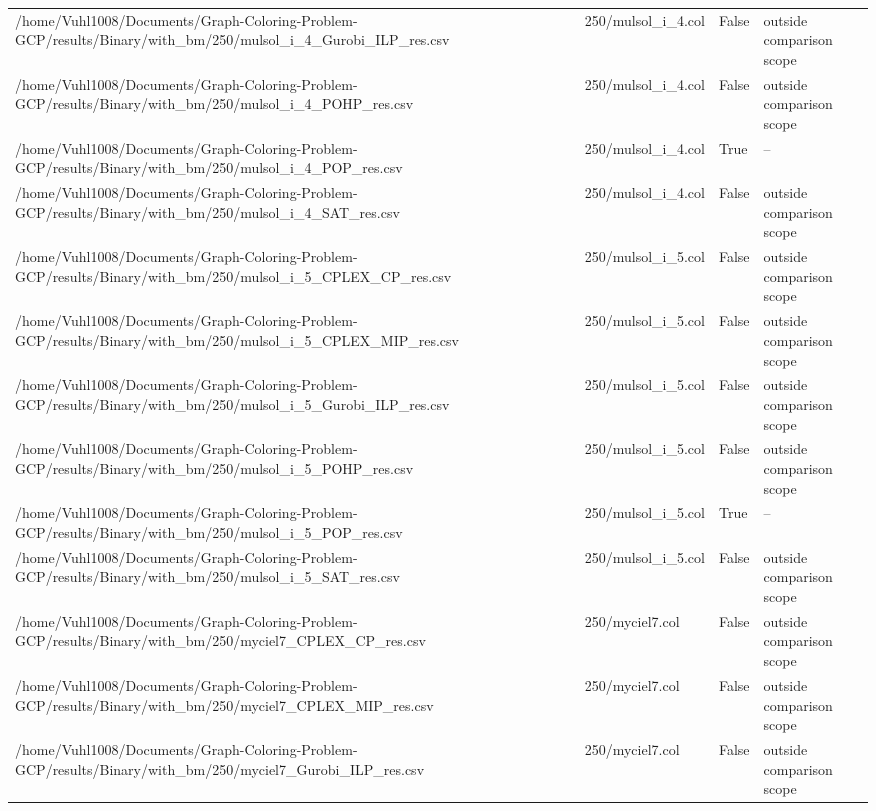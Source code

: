 \begin{table}[htbp]
\begin{tabular}{llll}
/home/Vuhl1008/Documents/Graph-Coloring-Problem-GCP/results/Binary/with\_bm/250/mulsol\_i\_4\_Gurobi\_ILP\_res.csv & 250/mulsol\_i\_4.col & False & outside comparison scope \\
/home/Vuhl1008/Documents/Graph-Coloring-Problem-GCP/results/Binary/with\_bm/250/mulsol\_i\_4\_POHP\_res.csv & 250/mulsol\_i\_4.col & False & outside comparison scope \\
/home/Vuhl1008/Documents/Graph-Coloring-Problem-GCP/results/Binary/with\_bm/250/mulsol\_i\_4\_POP\_res.csv & 250/mulsol\_i\_4.col & True & -- \\
/home/Vuhl1008/Documents/Graph-Coloring-Problem-GCP/results/Binary/with\_bm/250/mulsol\_i\_4\_SAT\_res.csv & 250/mulsol\_i\_4.col & False & outside comparison scope \\
/home/Vuhl1008/Documents/Graph-Coloring-Problem-GCP/results/Binary/with\_bm/250/mulsol\_i\_5\_CPLEX\_CP\_res.csv & 250/mulsol\_i\_5.col & False & outside comparison scope \\
/home/Vuhl1008/Documents/Graph-Coloring-Problem-GCP/results/Binary/with\_bm/250/mulsol\_i\_5\_CPLEX\_MIP\_res.csv & 250/mulsol\_i\_5.col & False & outside comparison scope \\
/home/Vuhl1008/Documents/Graph-Coloring-Problem-GCP/results/Binary/with\_bm/250/mulsol\_i\_5\_Gurobi\_ILP\_res.csv & 250/mulsol\_i\_5.col & False & outside comparison scope \\
/home/Vuhl1008/Documents/Graph-Coloring-Problem-GCP/results/Binary/with\_bm/250/mulsol\_i\_5\_POHP\_res.csv & 250/mulsol\_i\_5.col & False & outside comparison scope \\
/home/Vuhl1008/Documents/Graph-Coloring-Problem-GCP/results/Binary/with\_bm/250/mulsol\_i\_5\_POP\_res.csv & 250/mulsol\_i\_5.col & True & -- \\
/home/Vuhl1008/Documents/Graph-Coloring-Problem-GCP/results/Binary/with\_bm/250/mulsol\_i\_5\_SAT\_res.csv & 250/mulsol\_i\_5.col & False & outside comparison scope \\
/home/Vuhl1008/Documents/Graph-Coloring-Problem-GCP/results/Binary/with\_bm/250/myciel7\_CPLEX\_CP\_res.csv & 250/myciel7.col & False & outside comparison scope \\
/home/Vuhl1008/Documents/Graph-Coloring-Problem-GCP/results/Binary/with\_bm/250/myciel7\_CPLEX\_MIP\_res.csv & 250/myciel7.col & False & outside comparison scope \\
/home/Vuhl1008/Documents/Graph-Coloring-Problem-GCP/results/Binary/with\_bm/250/myciel7\_Gurobi\_ILP\_res.csv & 250/myciel7.col & False & outside comparison scope \\

\end{tabular}
\end{table}
